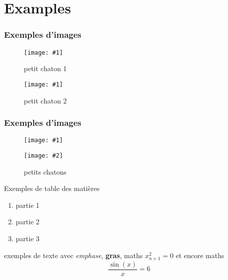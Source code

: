 \documentclass[compress]{beamer} %
\newcommand{\insertTwoF}[4]{
  \begin{figure}[h!]
    \centering
    \begin{minipage}{#4\linewidth}
    \texttt{[image: \#1]}
    \end{minipage}
    \begin{minipage}{#4\linewidth}
    \texttt{[image: \#2]}
    \end{minipage}
      \caption{#3}
  \end{figure}  
}
\newcommand{\insertF}[3]{
  \begin{figure}[h!]
    \centering
    \begin{minipage}{#3\linewidth}
    \texttt{[image: \#1]}
    \end{minipage}  
      \caption{#2}
  \end{figure}  
}
\begin{document}
 \section{Examples}
 
 \begin{frame}
  \frametitle{Exemples d'images}
  \insertF{Fig/chat1.jpg}{petit chaton 1}{0.3}
  \insertF{Fig/chat2.jpg}{petit chaton 2}{0.3}
 \end{frame}
 
 \begin{frame}
  \frametitle{Exemples d'images}
  \insertTwoF{Fig/chat1.jpg}{Fig/chat2.jpg}{petits chatons}{0.4}
 \end{frame}
 \begin{frame}
   Exemples de table des matières

 \begin{enumerate}


   \item partie 1
   \item partie 2
   \item partie 3
   
 \end{enumerate}

 
 \end{frame} 
 
 \begin{frame}
 exemples de texte avec \emph{emphase}, \textbf{gras}, maths $x_{n+1}^2=0$ et encore maths
 \[
 \frac{\sin(x)}{x} = 6
 \]
 \end{frame}
 
\end{document}
